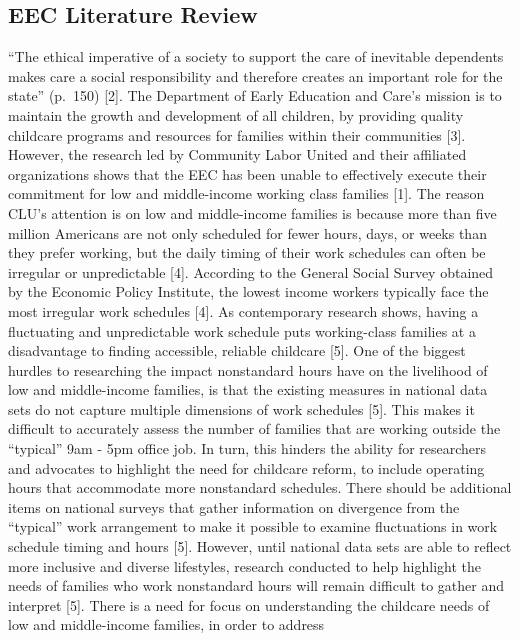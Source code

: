 \documentclass[10pt,letterpaper]{article}
\begin{document}
\subsection{EEC Literature Review}\label{eec-literature-review}

``The ethical imperative of a society to support the care of inevitable
dependents makes care a social responsibility and therefore creates an
important role for the state'' (p.~150) {[}2{]}. The Department of Early
Education and Care's mission is to maintain the growth and development
of all children, by providing quality childcare programs and resources
for families within their communities {[}3{]}. However, the research led
by Community Labor United and their affiliated organizations shows that
the EEC has been unable to effectively execute their commitment for low
and middle-income working class families {[}1{]}. The reason CLU's
attention is on low and middle-income families is because more than five
million Americans are not only scheduled for fewer hours, days, or weeks
than they prefer working, but the daily timing of their work schedules
can often be irregular or unpredictable {[}4{]}. According to the
General Social Survey obtained by the Economic Policy Institute, the
lowest income workers typically face the most irregular work schedules
{[}4{]}. As contemporary research shows, having a fluctuating and
unpredictable work schedule puts working-class families at a
disadvantage to finding accessible, reliable childcare {[}5{]}. One of
the biggest hurdles to researching the impact nonstandard hours have on
the livelihood of low and middle-income families, is that the existing
measures in national data sets do not capture multiple dimensions of
work schedules {[}5{]}. This makes it difficult to accurately assess the
number of families that are working outside the ``typical'' 9am - 5pm
office job. In turn, this hinders the ability for researchers and
advocates to highlight the need for childcare reform, to include
operating hours that accommodate more nonstandard schedules. There
should be additional items on national surveys that gather information
on divergence from the ``typical'' work arrangement to make it possible
to examine fluctuations in work schedule timing and hours {[}5{]}.
However, until national data sets are able to reflect more inclusive and
diverse lifestyles, research conducted to help highlight the needs of
families who work nonstandard hours will remain difficult to gather and
interpret {[}5{]}. There is a need for focus on understanding the
childcare needs of low and middle-income families, in order to address
\end{document}
